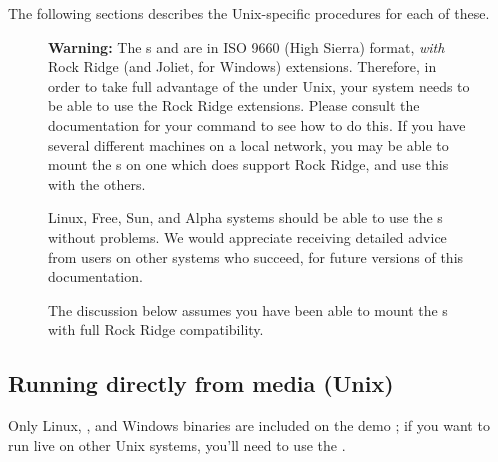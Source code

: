 \documentclass{article}
\begin{document}
\noindent The following sections describes the Unix-specific procedures
for each of these.

\ifSingleColumn \begin{figure}[ht]\noindent \fi
\begin{warningbox}
\textbf{Warning: } The \TK{} \CD{}s and \DVD{} are in ISO 9660 (High Sierra)
format, \emph{with} Rock Ridge (and Joliet, for Windows)
extensions. Therefore, in order to take full advantage of the \TK{}
under Unix, your system needs to be able to use the Rock Ridge
extensions.  Please consult the documentation for your 
command to see how to do this.  If you have several different machines
on a local network, you may be able to mount the \CD{}s on one which
does support Rock Ridge, and use this with the others.

\leavevmode\quad Linux, Free, Sun,  and
Alpha systems should be able to use the \CD{}s without problems. We
would appreciate receiving detailed advice from users on other systems
who succeed, for future versions of this documentation.

\leavevmode\quad
The discussion below assumes you have been able to mount
the \CD{}s with full Rock Ridge compatibility.
\end{warningbox}
\ifSingleColumn\end{figure}\fi


% 
\subsection{Running \protect\TeXLive{} directly from media (Unix)}

\def\runlive{%
It is possible to use the \TeX{} system directly from the \pkgname{demo}
\CD{} or the \pkgname{live} \DVD{}, without installing the distribution
to disk.  (Thus the name `\TeXLive', in fact.)  It is \emph{not}
possible to run \TeX{} directly from the \pkgname{inst} \CD (see
section~\ref{sec:multiple-dist} on p.~\pageref{sec:multiple-dist}).
}

Only Linux, \MacOSX, and Windows binaries are included on the demo \CD;
if you want to run live on other Unix systems, you'll need to use the
\DVD.

\def\startinst{%
To start, we must mount the \CD{} or \DVD{}, with Rock Ridge extensions
enabled.  The exact command to do this varies from system to system; the
following works under Linux, except the name of the device
(\filename{/dev/cdrom}, here) may vary. (All our examples will use
\texttt{>} as the shell prompt; user input is \underline{underlined}.)
\begin{alltt}
> \Ucom{mount -t iso9660 /dev/cdrom /mnt/cdrom}
\end{alltt}

\noindent Change the current directory to the mount point:
\begin{alltt}
> \Ucom{cd /mnt/cdrom}
\end{alltt}

\noindent Under \MacOSX, the directory is typically under
\dirname{/Volumes}, and the media will be mounted automatically.
}
\end{document}
